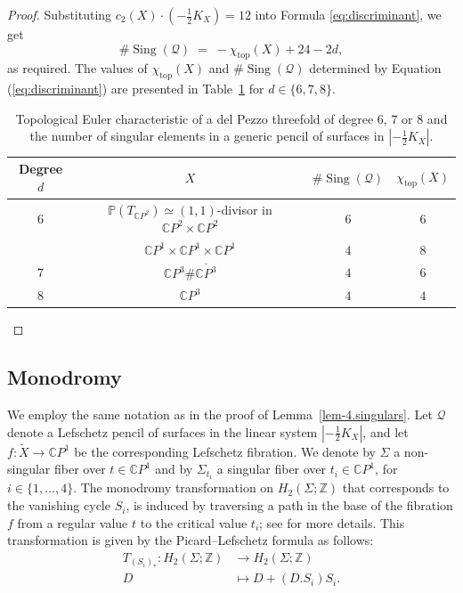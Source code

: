 \documentclass[10pt,a4paper]{article}
\numberwithin{equation}{section}
\theoremstyle{definition}
\theoremstyle{plain}
\theoremstyle{remark}
\newcommand{\C}{\mathbb{C}}
\DeclareMathOperator{\Sing}{Sing}
\newcommand{\lra}{\longrightarrow}
\begin{document}
\begin{proof}
Substituting $c_2(X)\cdot (-\frac{1}{2}K_X)=12$ into Formula \eqref{eq:discriminant}, we get
\[
\#\Sing(\mathcal{Q})\;=\;-\chi_\mathrm{top}(X)+24-2d,
\]
as required.
The values of $\chi_\mathrm{top}(X)$ and $\#\Sing(\mathcal{Q})$ determined by Equation (\ref{eq:discriminant}) are presented in Table~\ref{Tab:singular.surfaces} for $d\in \{6,7,8\}$.
\begin{table}[h]
\centering\renewcommand{\arraystretch}{1.2}
\begin{tabular}{|c|c|c|c|}
\hline
Degree $d$ & \emph{$X$} & $\#\Sing(\mathcal{Q})$ & $\chi_\mathrm{top}(X)$ \\
\hline
$6$ & $\mathbb{P}(T_{\mathbb{C}P^2}) \simeq (1,1)$-divisor in $\mathbb{C}P^2 \times \mathbb{C}P^2$ & $6$ & $6$ \\
    &$\mathbb{C}P^1 \times \mathbb{C}P^1 \times \mathbb{C}P^1$  & $4$ & $8$ \\
\hline
$7$ & $\mathbb{C}P^3\#\overline{\mathbb{C}P^3}$ & $4$ & $6$ \\
\hline
$8$ & $\mathbb{C}P^3$ & $4$ & $4$ \\
\hline
\end{tabular}
\caption{Topological Euler characteristic of a del Pezzo threefold of degree  $6$, $7$ or $8$ and the number of singular elements in a generic pencil of surfaces in $|-\frac{1}{2}K_X|$.} \label{Tab:singular.surfaces}
\end{table}
\end{proof}

\subsection{Monodromy} \label{Sect-Monodromy}
We employ the same notation as in the proof of Lemma~\ref{lem-4.singulars}. Let $\mathcal{Q}$ denote a Lefschetz pencil of surfaces in the linear system $|-\frac{1}{2}K_X|$, and let $f\colon \tilde{X} \to \mathbb{C}P^1$ be the corresponding Lefschetz fibration. We denote by $\Sigma$ a non-singular fiber over $t\in \C P^1$ and by $\Sigma_{t_i}$ a singular fiber over $t_i\in \C P^1$, for $i\in \{1,\ldots,4\}$. The monodromy transformation on $H_2(\Sigma; \mathbb{Z})$ that corresponds to the vanishing cycle $S_i$, is induced by traversing a path in the base of the fibration $f$ from a regular value $t$ to the critical value $t_i$; see \cite[Section 2.2.2]{nguyen2022real} for more details. This transformation is given by the Picard--Lefschetz formula as follows:
 \begin{align*}
     T_{(S_i)_*}\colon  H_2(\Sigma;\mathbb{Z})&\lra H_2(\Sigma;\mathbb{Z})\\
   D&\longmapsto D+(D.S_i)S_i.
 \end{align*}
\end{document}
